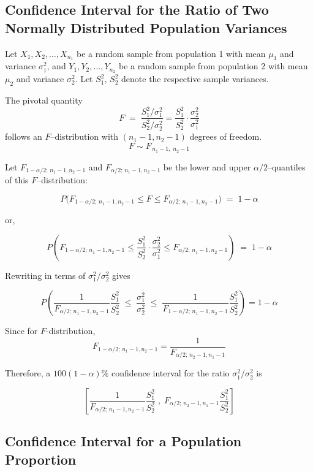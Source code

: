 \documentclass[twoside]{book}
\begin{document}
\subsection{Confidence Interval for the Ratio of Two Normally Distributed Population Variances}

Let \(X_1, X_2, \dots, X_{n_1}\) be a random sample from population 1 with mean \(\mu_1\) and variance \(\sigma_1^2\), and \(Y_1, Y_2, \dots, Y_{n_2}\) be a random sample from population 2 with mean \(\mu_2\) and variance \(\sigma_2^2\). Let \(S_1^2\), \(S_2^2\) denote the respective sample variances.

The pivotal quantity
\[
F \;=\;
\dfrac{S_1^2/\sigma_1^2}{S_2^2/\sigma_2^2} = \dfrac{S_1^2}{S_2^2}\cdot \dfrac{\sigma_2^2}{\sigma_1^2}
\]
follows an $F$–distribution with $(n_1-1,n_2-1)$ degrees of freedom.
\[
F \sim F_{\,n_1-1,\;n_2-1}
\]

Let $F_{1-\alpha/2;\,n_1-1,n_2-1}$ and $F_{\alpha/2;\,n_1-1,n_2-1}$ be the lower and upper $\alpha/2$–quantiles of this $F$–distribution:

\[
P\bigl(F_{1-\alpha/2;\,n_1-1,n_2-1}\le F\le F_{\alpha/2;\,n_1-1,n_2-1}\bigr) \;=\; 1-\alpha
\]

or,

\[
P\left( F_{1-\alpha/2;\,n_1-1,n_2-1}\le \dfrac{S_1^2}{S_2^2}\cdot \dfrac{\sigma_2^2}{\sigma_1^2} \leq F_{\alpha/2;\,n_1-1,n_2-1} \right) \;=\; 1-\alpha
\]

Rewriting in terms of $\sigma_1^2/\sigma_2^2$ gives

\[
P\left(
\frac{1}{F_{\alpha/2;\,n_1-1,n_2-1}}\frac{S_1^2}{S_2^2}
\;\le\;
\frac{\sigma_1^2}{\sigma_2^2}
\;\le\;
\frac{1}{F_{1-\alpha/2;\,n_1-1,n_2-1}}\frac{S_1^2}{S_2^2}
\right)
=1-\alpha
\]

Since for $ F $-distribution,
$$F_{1-\alpha/2;\,n_1-1,n_2-1} = \dfrac{1}{F_{\alpha/2;\,n_2-1,n_1-1}}$$

Therefore, a $100(1-\alpha)\%$ confidence interval for the ratio $\sigma_1^2/\sigma_2^2$ is

\begin{textbox}
	\[
	\left[
	\frac{1}{F_{\alpha/2;\,n_1-1,n_2-1}}\frac{S_1^2}{S_2^2}
	\;,\;
	{F_{\alpha/2;\,n_2-1,n_1-1}}\frac{S_1^2}{S_2^2}
	\right]
	\]
\end{textbox}


\subsection{Confidence Interval for a Population Proportion}
\end{document}

